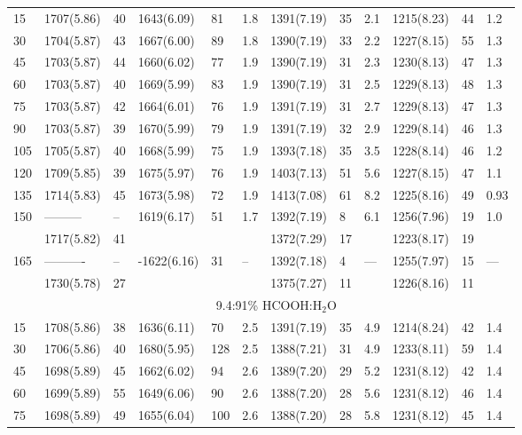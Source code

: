 \documentclass{aa}
\begin{document}
\begin{appendix}
\begin{table*}
\begin{center}
\begin{tabular}{l|lllll|lll|lll}
\hline
15           & 1707(5.86) & 40 & 1643(6.09) & 81 & 1.8 & 1391(7.19) & 35 & 2.1 & 1215(8.23) & 44 & 1.2 \\
30           & 1704(5.87) & 43 & 1667(6.00) & 89 & 1.8 & 1390(7.19) & 33 & 2.2 & 1227(8.15) & 55 & 1.3 \\
45           & 1703(5.87) & 44 & 1660(6.02) & 77 & 1.9 & 1390(7.19) & 31 & 2.3 & 1230(8.13) & 47 & 1.3 \\
60           & 1703(5.87) & 40 & 1669(5.99) & 83 & 1.9 & 1390(7.19) & 31 & 2.5 & 1229(8.13) & 48 & 1.3 \\
75           & 1703(5.87) & 42 & 1664(6.01) & 76 & 1.9 & 1391(7.19) & 31 & 2.7 & 1229(8.13) & 47 & 1.3 \\
90           & 1703(5.87) & 39 & 1670(5.99) & 79 & 1.9 & 1391(7.19) & 32 & 2.9 & 1229(8.14) & 46 & 1.3 \\
105          & 1705(5.87) & 40 & 1668(5.99) & 75 & 1.9 & 1393(7.18) & 35 & 3.5 & 1228(8.14) & 46 & 1.2 \\
120          & 1709(5.85) & 39 & 1675(5.97) & 76 & 1.9 & 1403(7.13) & 51 & 5.6 & 1227(8.15) & 47 & 1.1 \\
135          & 1714(5.83) & 45 & 1673(5.98) & 72 & 1.9 & 1413(7.08) & 61 & 8.2 & 1225(8.16) & 49 & 0.93 \\
150          & ---------  & -- & 1619(6.17) & 51 & 1.7 & 1392(7.19) &  8 & 6.1 & 1256(7.96) & 19 & 1.0 \\
             & 1717(5.82) & 41 &            &    &     & 1372(7.29) & 17 &     & 1223(8.17) & 19 &     \\
165          & ---------- & -- &-1622(6.16) & 31 &  -- & 1392(7.18) &  4 & --- & 1255(7.97) & 15 & --- \\
             & 1730(5.78) & 27 &            &    &     & 1375(7.27) & 11 &     & 1226(8.16) & 11 &     \\
\hline
 & \multicolumn{11}{c}{9.4:91\% HCOOH:H$_2$O}\\
\hline
15           & 1708(5.86) & 38 & 1636(6.11) & 70 & 2.5 & 1391(7.19) &  35 & 4.9 & 1214(8.24) & 42 & 1.4\\
30           & 1706(5.86) & 40 & 1680(5.95) &128 & 2.5 & 1388(7.21) &  31 & 4.9 & 1233(8.11) & 59 & 1.4\\
45           & 1698(5.89) & 45 & 1662(6.02) & 94 & 2.6 & 1389(7.20) &  29 & 5.2 & 1231(8.12) & 42 & 1.4\\
60           & 1699(5.89) & 55 & 1649(6.06) & 90 & 2.6 & 1388(7.20) &  28 & 5.6 & 1231(8.12) & 46 & 1.4\\
75           & 1698(5.89) & 49 & 1655(6.04) &100 & 2.6 & 1388(7.20) &  28 & 5.8 & 1231(8.12) & 45 & 1.4\\

\end{tabular}
\end{center}
\end{table*}
\end{appendix}
\end{document}
